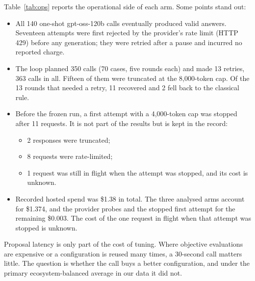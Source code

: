 Table~\ref{tab:ops} reports the operational side of each arm. Some points stand out:
\begin{itemize}
  \item All 140 one-shot gpt-oss-120b calls eventually produced valid answers. Seventeen attempts were first rejected by the provider's rate limit (HTTP 429) before any generation; they were retried after a pause and incurred no reported charge.
  \item The loop planned 350 calls (70 cases, five rounds each) and made 13 retries, 363 calls in all. Fifteen of them were truncated at the 8,000-token cap. Of the 13 rounds that needed a retry, 11 recovered and 2 fell back to the classical rule.
  \item Before the frozen run, a first attempt with a 4,000-token cap was stopped after 11 requests. It is not part of the results but is kept in the record:
  \begin{itemize}
    \item 2 responses were truncated;
    \item 8 requests were rate-limited;
    \item 1 request was still in flight when the attempt was stopped, and its cost is unknown.
  \end{itemize}
  \item Recorded hosted spend was \$1.38 in total. The three analysed arms account for \$1.374, and the provider probes and the stopped first attempt for the remaining \$0.003. The cost of the one request in flight when that attempt was stopped is unknown.
\end{itemize}
Proposal latency is only part of the cost of tuning. Where objective evaluations are expensive or a configuration is reused many times, a 30-second call matters little. The question is whether the call buys a better configuration, and under the primary ecosystem-balanced average in our data it did not.


